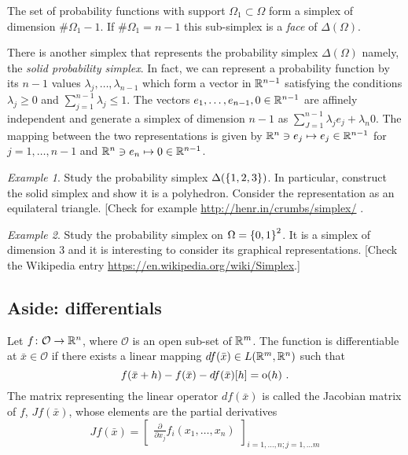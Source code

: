 \documentclass[12pt,a4paper]{amsart}
\theoremstyle{plain}%
\theoremstyle{definition}
\theoremstyle{remark}
\newtheorem{example}{Example}
\begin{document}
The set of probability functions with support $\Omega_1 \subset \Omega$ form a simplex of dimension $\# \Omega_1 -1$. If $\#\Omega_1 = n-1$ this sub-simplex is a \emph{face} of $\Delta(\Omega)$.

There is another simplex that represents the probability simplex $\Delta(\Omega)$ namely, the \emph{solid probability simplex}. In fact, we can represent a probability function by its $n-1$ values $\lambda_j,\dots,\lambda_{n-1}$ which form a vector in $\mathbb{R}^{n-1}$ satisfying the conditions $\lambda_j \geq 0$ and $\sum_{j=1}^{n-1} \lambda_j \leq 1$. The vectors $e_1,\dots,e_{n-1},0 \in \mathbb{R}^{n-1}$ are affinely independent and generate a simplex of dimension $n-1$ as $\sum_{J=1}^{n-1} \lambda_j e_j + \lambda_n 0$. The mapping between the two representations is given by $\mathbb{R}^n \ni e_j \mapsto e_j \in \mathbb{R}^{n-1}$ for $j=1,\dots,n-1$ and $\mathbb{R}^n \ni e_n \mapsto 0 \in \mathbb{R}^{n-1}$.

\begin{example}
  Study the probability simplex $\Delta(\left\{1,2,3\right\})$. In particular, construct the solid simplex and show it is a polyhedron. Consider the representation as an equilateral triangle. [Check for example \url{http://henr.in/crumbs/simplex/}
.\end{example}

\begin{example}
  Study the probability simplex on $\Omega = \left\{0,1\right\}^2$. It is a simplex of dimension 3 and it is interesting to consider its graphical representations. [Check the Wikipedia entry \url{https://en.wikipedia.org/wiki/Simplex}.]
\end{example}

\subsection{Aside: differentials}
Let $f \colon \mathcal O \to \mathbb{R}^n$, where $\mathcal O$ is an open sub-set of $\mathbb{R}^m$. The function is differentiable at $\bar x \in \mathcal O$ if there exists a linear mapping $df(\bar x) \in L(\mathbb{R}^m,\mathbb{R}^n)$ such that
\begin{equation*}
f(\bar x + h) - f(\bar x) - df(\bar x)[h] = \operatorname{o}(h) \ .
\end{equation*}
The matrix representing the linear operator $df(\bar x)$ is called the Jacobian matrix of $f$, $Jf(\bar x)$, whose elements are the partial derivatives
\begin{equation*}
  Jf(\bar x) =
  \begin{bmatrix}
    \frac{\partial}{\partial x_j} f_i(x_1,\dots,x_n)
  \end{bmatrix}_{i=1,\dots,n; j=1,\dots m}
\end{equation*}
\end{document}

